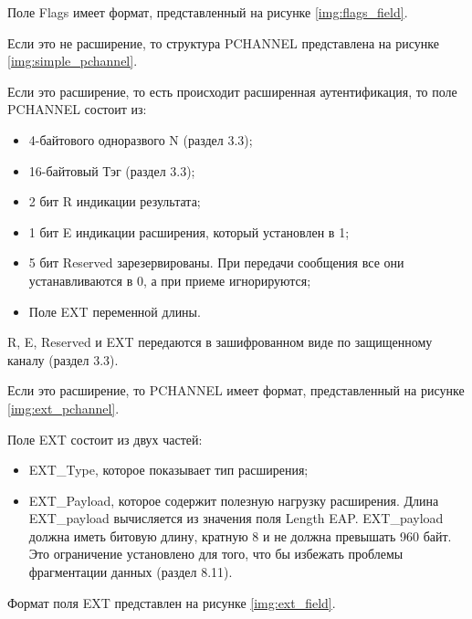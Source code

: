 Поле Flags имеет формат, представленный на рисунке \ref{img:flags_field}.

Если это не расширение, то структура PCHANNEL представлена на рисунке \ref{img:simple_pchannel}.

Если это расширение, то есть происходит расширенная аутентификация, то поле PCHANNEL состоит из:

\begin{itemize}
\item 4-байтового одноразвого N (раздел 3.3);
\item 16-байтовый Тэг (раздел 3.3);
\item 2 бит R индикации результата;
\item 1 бит E индикации расширения, который установлен в 1;
\item 5 бит Reserved зарезервированы. При передачи сообщения все они устанавливаются в 0, а при приеме игнорируются;
\item Поле EXT переменной длины.
\end{itemize}

R, E, Reserved и EXT передаются в зашифрованном виде по защищенному каналу (раздел 3.3).

Если это расширение, то PCHANNEL имеет формат, представленный на рисунке \ref{img:ext_pchannel}.

Поле EXT состоит из двух частей:

\begin{itemize}
\item EXT\_Type, которое показывает тип расширения;
\item EXT\_Payload, которое содержит полезную нагрузку расширения. Длина EXT\_payload вычисляется из значения поля Length EAP. EXT\_payload должна иметь битовую длину, кратную 8 и не должна превышать 960 байт. Это ограничение установлено для того, что бы избежать проблемы фрагментации данных (раздел 8.11).
\end{itemize}

Формат поля EXT представлен на рисунке \ref{img:ext_field}.
